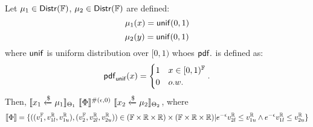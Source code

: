 \documentclass[a4paper,11pt]{article}
\begin{document}
%
\newpage
\begin{thm}
\label{thm:unif_coupling}
Let $\mu_1 \in \mathsf{Distr}(\mathbb{F})$, $\mu_2 \in \mathsf{Distr}(\mathbb{F})$ are defined:
\[
	\mu_1(x) = \mathsf{unif}(0, 1)
\]
\[
	\mu_2(y) = \mathsf{unif}(0, 1)
\]
where $\mathsf{unif}$ is uniform distribution over $[0, 1)$ whoes $\mathsf{pdf}.$ is defined as:
\[
	\mathsf{pdf}_{\mathsf{unif}}(x) = 
	\begin{cases}
	1 & x \in [0, 1)^{\mathbb{F}}\\
	0       & o.w.
	\end{cases}.
\]
Then, $	\llbracket x_1 \xleftarrow{\$} \mu_1 \rrbracket_{\Theta_1} 
		~ \llbracket \Phi \rrbracket^{\#(\epsilon, 0)} ~
		\llbracket x_2 \xleftarrow{\$} \mu_2 \rrbracket_{\Theta_2}$, 
where
\[
	\llbracket \Phi \rrbracket = 
	\{((v^{\mathbb{F}}_1, v^{\mathbb{R}}_{1l}, v^{\mathbb{R}}_{1u}), (v^{\mathbb{F}}_2, v^{\mathbb{R}}_{2l}, v^{\mathbb{R}}_{2u})) 
	\in (\mathbb{F} \times \mathbb{R} \times \mathbb{R}) \times (\mathbb{F} \times \mathbb{R} \times \mathbb{R})
	|
	e^{-\epsilon} v^{\mathbb{R}}_{2l} \leq v^{\mathbb{R}}_{1u}
	\land
	e^{-\epsilon} v^{\mathbb{R}}_{1l} \leq v^{\mathbb{R}}_{2u}
	\}
\]
\end{thm}
\end{document}
